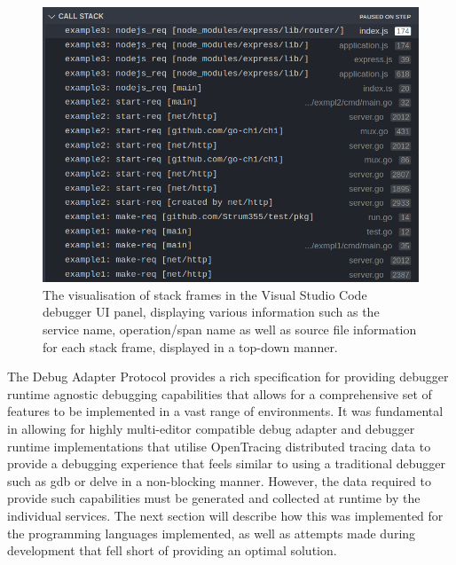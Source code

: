 \documentclass[12pt,pdftex,titlepage]{report}
\begin{document}
                \begin{figure}[htb!]
                    \centering
                    \includegraphics[scale=1.6]{vscodestack.png}
                    \caption{The visualisation of stack frames in the Visual Studio Code debugger UI panel, displaying various information such as the service name, operation/span
                    name as well as source file information for each stack frame, displayed in a top-down manner.}
                    \label{fig:stacks}
                \end{figure}

                \newpage
                The Debug Adapter Protocol provides a rich specification for providing debugger runtime agnostic debugging capabilities that allows for a comprehensive set of features to be implemented in a vast range of environments.
                It was fundamental in allowing for highly multi-editor compatible debug adapter and debugger runtime implementations that utilise OpenTracing distributed tracing data to provide a debugging experience that feels similar
                to using a traditional debugger such as gdb or delve in a non-blocking manner. However, the data required to provide such capabilities must be generated and collected at runtime by the individual services. The next section
                will describe how this was implemented for the programming languages implemented, as well as attempts made during development that fell short of providing an optimal solution.

\end{document}
